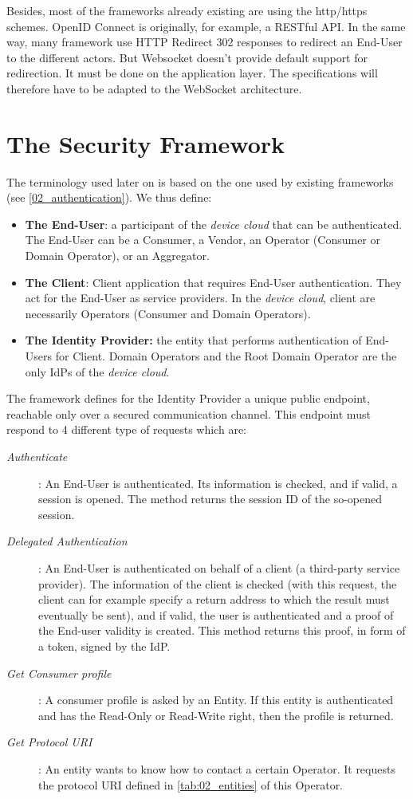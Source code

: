 Besides, most of the frameworks already existing are using the http/https schemes. OpenID Connect is originally, for example, a RESTful API. In the same way, many framework use HTTP Redirect 302 responses to redirect an End-User to the different actors. But Websocket doesn't provide default support for redirection. It must be done on the application layer. The specifications will therefore have to be adapted to the WebSocket architecture. 

\section{The Security Framework}
\label{sec:04_framework}

The terminology used later on is based on the one used by existing frameworks (see \ref{02_authentication}). We thus define:
\begin{itemize}
	\item \textbf{The End-User}: a participant of the \emph{device cloud} that can be authenticated. The End-User can be a Consumer, a Vendor, an Operator (Consumer or Domain Operator), or an Aggregator.
	\item \textbf{The Client}: Client application that requires End-User authentication. They act for the End-User as service providers. In the \emph{device cloud}, client are necessarily Operators (Consumer and Domain Operators).
	\item \textbf{The Identity Provider: } the entity that performs authentication of End-Users for Client. Domain Operators and the Root Domain Operator are the only IdPs of the \emph{device cloud}. 
\end{itemize}

The framework defines for the Identity Provider a unique public endpoint, reachable only over a secured communication channel. This endpoint must respond to 4 different type of requests which are:

\begin{description}
	\item[\textit{Authenticate}]: An End-User is authenticated. Its information is checked, and if valid, a session is opened. The method returns the session ID of the so-opened session.
	\item[\textit{Delegated Authentication}]: An End-User is authenticated on behalf of a client (a third-party service provider). The information of the client is checked (with this request, the client can for example specify a return address to which the result must eventually be sent), and if valid, the user is authenticated and a proof of the End-user validity is created. This method returns this proof, in form of a token, signed by the IdP.
	\item[\textit{Get Consumer profile}]: A consumer profile is asked by an Entity. If this entity is authenticated and has the Read-Only or Read-Write right, then the profile is returned.
	\item[\textit{Get Protocol URI}]: An entity wants to know how to contact a certain Operator. It requests the protocol URI defined in \ref{tab:02_entities} of this Operator.
\end{description}

